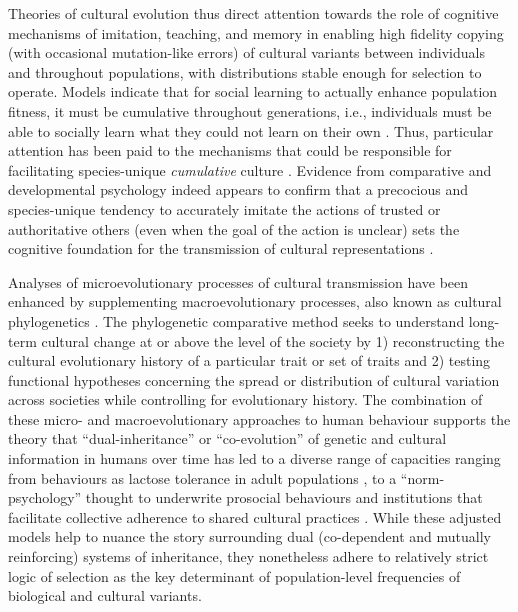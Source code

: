 Theories of cultural evolution thus direct attention towards the role of cognitive mechanisms of imitation, teaching, and memory in enabling high fidelity copying (with occasional mutation-like errors) of cultural variants between individuals and throughout populations, with distributions stable enough for selection to operate.  Models indicate that for social learning to actually enhance population fitness, it must be cumulative throughout generations, i.e., individuals must be able to socially learn what they could not learn on their own \citep{Boyd1995}.  Thus, particular attention has been paid to the mechanisms that could be responsible for facilitating species-unique \textit{cumulative} culture \citep{Tomasello2008}.  Evidence from comparative and developmental psychology indeed appears to confirm that a precocious and species-unique tendency to accurately imitate the actions of trusted or authoritative others (even when the goal of the action is unclear) sets the cognitive foundation for the transmission of cultural representations \citep{Tomasello2014a}.

Analyses of microevolutionary processes of cultural transmission have been enhanced by supplementing macroevolutionary processes, also known as cultural phylogenetics \citep{Mace1994}.  The phylogenetic comparative method seeks to understand long-term cultural change at or above the level of the society by 1) reconstructing the cultural evolutionary history of a particular trait or set of traits and 2) testing functional hypotheses concerning the spread or distribution of cultural variation across societies while controlling for evolutionary history.  The combination of these micro- and macroevolutionary approaches to human behaviour supports the theory that  ``dual-inheritance'' or ``co-evolution'' of genetic and cultural information in humans over time has led to a diverse range of capacities ranging from behaviours as lactose tolerance in adult populations \citep{Feldman1989}, to a ``norm-psychology'' thought to underwrite prosocial behaviours and institutions that facilitate collective adherence to shared cultural practices \citep{Richerson2008,Chudek2011}.  While these adjusted models help to nuance the story surrounding dual (co-dependent and mutually reinforcing) systems of inheritance, they nonetheless adhere to relatively strict logic of selection as the key determinant of population-level frequencies of biological and cultural variants.


